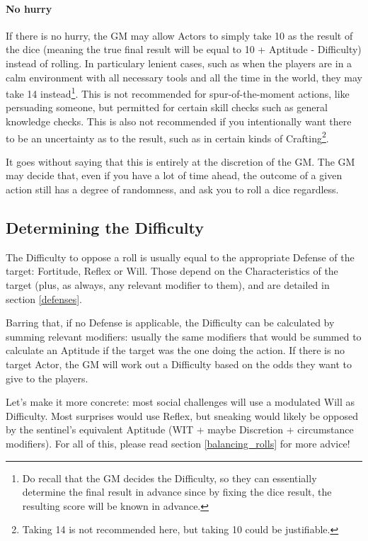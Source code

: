 \paragraph{No hurry} 

If there is no hurry, the GM may allow Actors to simply take 10 as the result of the dice (meaning the true final result will be equal to 10 + Aptitude - Difficulty) instead of rolling. In particulary lenient cases, such as when the players are in a calm environment with all necessary tools and all the time in the world, they may take 14 instead\footnote{Do recall that the GM decides the Difficulty, so they can essentially determine the final result in advance since by fixing the dice result, the resulting score will be known in advance.}. This is not recommended for spur-of-the-moment actions, like persuading someone, but permitted for certain skill checks such as general knowledge checks. This is also not recommended if you intentionally want there to be an uncertainty as to the result, such as in certain kinds of Crafting\footnote{Taking 14 is not recommended here, but taking 10 could be justifiable.}.

It goes without saying that this is entirely at the discretion of the GM. The GM may decide that, even if you have a lot of time ahead, the outcome of a given action still has a degree of randomness, and ask you to roll a dice regardless.


\subsection{Determining the Difficulty}
\label{difficulty}

The Difficulty to oppose a roll is usually equal to the appropriate Defense of the target: Fortitude, Reflex or Will. Those depend on the Characteristics of the target (plus, as always, any relevant modifier to them), and are detailed in section \ref{defenses}. 

Barring that, if no Defense is applicable, the Difficulty can be calculated by summing relevant modifiers: usually the same modifiers that would be summed to calculate an Aptitude if the target was the one doing the action. If there is no target Actor, the GM will work out a Difficulty based on the odds they want to give to the players.

Let's make it more concrete: most social challenges will use a modulated Will as Difficulty. Most surprises would use Reflex, but sneaking would likely be opposed by the sentinel's equivalent Aptitude (WIT + maybe Discretion + circumstance modifiers). For all of this, please read section \ref{balancing_rolls} for more advice!

